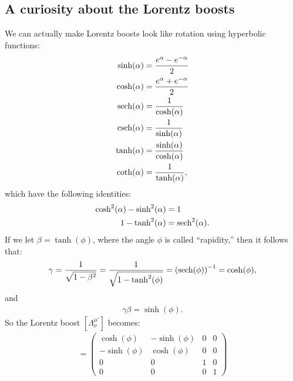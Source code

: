 \documentclass{book}
\theoremstyle{definition}
\begin{document}
\subsection{A curiosity about the Lorentz boosts}
We can actually make Lorentz boosts look like rotation using hyperbolic functions: 
\begin{align*}
\sinh(\alpha) &= \frac{e^{\alpha} - e^{-\alpha}}{2}\\
\cosh(\alpha) &= \frac{e^\alpha + e^{-\alpha}}{2}\\
\sech(\alpha) &= \frac{1}{\cosh(\alpha)}\\
\csch(\alpha) &= \frac{1}{\sinh(\alpha)}\\
\tanh(\alpha) &= \frac{\sinh(\alpha)}{\cosh(\alpha)}\\
\coth(\alpha) &= \frac{1}{\tanh(\alpha)},
\end{align*}
which have the following identities:
\begin{align*}
\cosh^2(\alpha) - \sinh^2(\alpha) &= 1\\
1 - \tanh^2(\alpha) &= \sech^2(\alpha).
\end{align*}
If we let $\beta = \tanh(\phi)$, where the angle $\phi$ is called ``rapidity,'' then it follows that:
\begin{align*}
\gamma = \frac{1}{\sqrt{1-\beta^2}} = \frac{1}{\sqrt{1-\tanh^2(\phi)}} = \left( \sech(\phi)  \right)^{-1} = \cosh(\phi), 
\end{align*}
and
\begin{align*}
\gamma\beta = \sinh(\phi).
\end{align*}
So the Lorentz boost $[\Lambda^{\mu'}_\nu]$ becomes:
\begin{align*}
[\Lambda^{\mu'}_\nu] =
\begin{pmatrix}
\cosh(\phi) & -\sinh(\phi) & 0 & 0\\
-\sinh(\phi) & \cosh(\phi) & 0 & 0\\
0 & 0 & 1 & 0\\
0 & 0 & 0 & 1
\end{pmatrix}
\end{align*}
\end{document}
